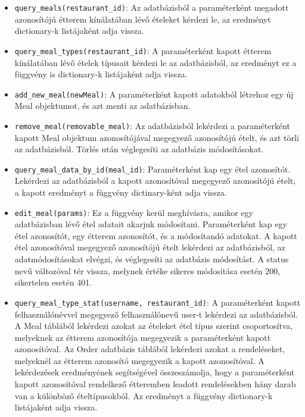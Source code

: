 \begin{itemize}
    \item \texttt{query\_meals(restaurant\_id)}:
        Az adatbázisból a paraméterként megadott azonosítójú étterem kínálatában lévő ételeket kérdezi le, az eredményt dictionary-k listájaként adja vissza.
    \item \texttt{query\_meal\_types(restaurant\_id)}:
        A paraméterként kapott étterem kínálatában lévő ételek típusait kérdezi le az adatbázisból, az eredményt ez a függvény is dictionary-k listájaként adja vissza.
    \item \texttt{add\_new\_meal(newMeal)}:
        A paraméterként kapott adatokból létrehoz egy új Meal objektumot, és azt menti az adatbázisban.
    \item \texttt{remove\_meal(removable\_meal)}:
        Az adatbázisból lekérdezi a paraméterként kapott Meal objektum azonosítójával megegyező azonosítójú ételt, és azt törli az adatbázisból. Törlés után véglegesíti az adatbázis módosításokat.
    \item \texttt{query\_meal\_data\_by\_id(meal\_id)}:
        Paraméterként kap egy étel azonosítót. Lekérdezi az adatbázisból a kapott azonosítóval megegyező azonosítójú ételt, a kapott eredményt a függvény dictinary-ként adja vissza.
    \item \texttt{edit\_meal(params)}:
        Ez a függvény kerül meghívásra, amikor egy adatbázisban lévő étel adatait akarjuk módosítani. Paraméterként kap egy étel azonosítót, egy étterem azonosítót, és a módosítandó adatokat. A kapott étel azonosítóval megegyező azonosítójú ételt lekérdezi az adatbázisból, az adatmódosításokat elvégzi, és véglegesíti az adatbázis módosítást. A status nevű változóval tér vissza, melynek értéke sikeres módosítása esetén 200, sikertelen esetén 401.
    \item \texttt{query\_meal\_type\_stat(username, restaurant\_id)}:
        A paraméterként kapott felhasználónévvel megegyező felhasználónevű user-t lekérdezi az adatbázisból. A Meal táblából lekérdezi azokat az ételeket étel típus szerint csoportosítva, melyeknek az étterem azonosítója megegyezik a paraméterként kapott azonosítóval. Az Order adatbázis táblából lekérdezi azokat a rendeléseket, melyeknél az étterem azonosító megegyezik a kapott azonosítóval. A lekérdezések eredményének segítségével összeszámolja, hogy a paraméterként kapott azonosítóval rendelkező étteremben leadott rendelésekben hány darab van a különböző ételtípusokból. Az eredményt a függvény dictionary-k listájaként adja vissza.
\end{itemize}

